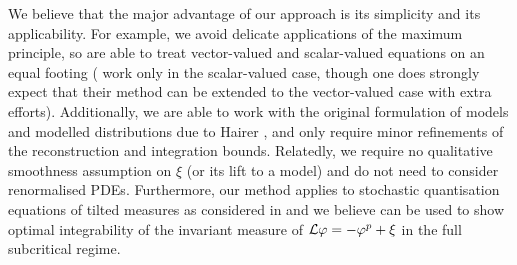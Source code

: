 \documentclass[11pt,a4paper]{article}
\numberwithin{equation}{section}
\theoremstyle{definition}
\theoremstyle{remark}
\begin{document}
We believe that the major advantage of our approach is its simplicity and its applicability.
For example, we avoid delicate applications of the maximum principle, so are able to treat vector-valued and scalar-valued equations on an equal footing (\cite{MW20_reaction,MoinatWeber20,CMW23} work only in the scalar-valued case, though one does strongly expect that their method can be extended to the vector-valued case with extra efforts).
Additionally, we are able to work with the original formulation of models and modelled distributions due to Hairer \cite{Hairer14}, and only require minor refinements of the reconstruction and integration bounds.
Relatedly, we require no qualitative smoothness assumption on $\xi$ (or its lift to a model)
and do not need to consider renormalised PDEs.
Furthermore, our method applies to stochastic quantisation equations of tilted measures as considered in \cite{Hairer_Steele_22} and we believe can be used to show optimal integrability of the invariant measure of $\mathcal{L} \varphi = -\varphi^p +\xi$ in the full subcritical regime.

\bigskip
\end{document}

